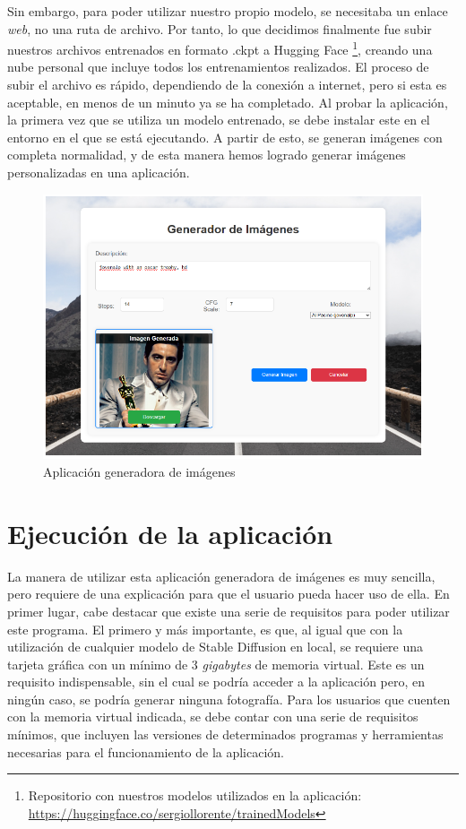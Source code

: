Sin embargo, para poder utilizar nuestro propio modelo, se necesitaba un enlace \textit{web}, no una ruta de archivo. Por tanto, lo que decidimos finalmente fue subir nuestros archivos entrenados en formato .ckpt a Hugging Face \footnote{Repositorio con nuestros modelos utilizados en la aplicación: \url{https://huggingface.co/sergiollorente/trainedModels}}, creando una nube personal que incluye todos los entrenamientos realizados. El proceso de subir el archivo es rápido, dependiendo de la conexión a internet, pero si esta es aceptable, en menos de un minuto ya se ha completado. Al probar la aplicación, la primera vez que se utiliza un modelo entrenado, se debe instalar este en el entorno en el que se está ejecutando. A partir de esto, se generan imágenes con completa normalidad, y de esta manera hemos logrado generar imágenes personalizadas en una aplicación.\\

\begin{figure}[!htb]
	\centering
	\includegraphics[width = 1
	\textwidth]{Imagenes/Vectorial/genapp.png}
	\caption{Aplicación generadora de imágenes}
	\label{fig:appgen}
\end{figure}




\section{Ejecución de la aplicación}

La manera de utilizar esta aplicación generadora de imágenes es muy sencilla, pero requiere de una explicación para que el usuario pueda hacer uso de ella. En primer lugar, cabe destacar que existe una serie de requisitos para poder utilizar este programa. El primero y más importante, es que, al igual que con la utilización de cualquier modelo de Stable Diffusion en local, se requiere una tarjeta gráfica con un mínimo de 3 \textit{gigabytes} de memoria virtual. Este es un requisito indispensable, sin el cual se podría acceder a la aplicación pero, en ningún caso, se podría generar ninguna fotografía. Para los usuarios que cuenten con la memoria virtual indicada, se debe contar con una serie de requisitos mínimos, que incluyen las versiones de determinados programas y herramientas necesarias para el funcionamiento de la aplicación.\\

